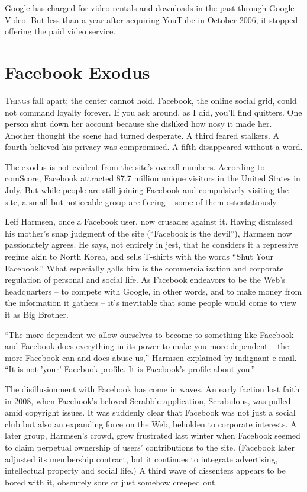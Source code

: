 ﻿\documentclass[12pt]{article}
\begin{document}
Google has charged for video rentals and downloads in the past through Google Video. But less than a
year after acquiring YouTube in October 2006, it stopped offering the paid video service.

\section{Facebook Exodus\cite{Exodus}}

\lettrine{T}{hings} fall apart; the center cannot hold. Facebook, the online social grid, could not
command loyalty forever. If you ask around, as I did, you'll find quitters. One person shut down her
account because she disliked how nosy it made her. Another thought the scene had turned desperate. A
third feared stalkers. A fourth believed his privacy was compromised. A fifth disappeared without a
word.

The exodus is not evident from the site's overall numbers. According to comScore, Facebook attracted
87.7 million unique visitors in the United States in July. But while people are still joining
Facebook and compulsively visiting the site, a small but noticeable group are fleeing -- some of
them ostentatiously.

Leif Harmsen, once a Facebook user, now crusades against it. Having dismissed his mother's snap
judgment of the site (``Facebook is the devil''), Harmsen now passionately agrees. He says, not
entirely in jest, that he considers it a repressive regime akin to North Korea, and sells T-shirts
with the words ``Shut Your Facebook.'' What especially galls him is the commercialization and
corporate regulation of personal and social life. As Facebook endeavors to be the Web's headquarters
-- to compete with Google, in other words, and to make money from the information it gathers -- it's
inevitable that some people would come to view it as Big Brother.

``The more dependent we allow ourselves to become to something like Facebook -- and Facebook does
everything in its power to make you more dependent -- the more Facebook can and does abuse us,''
Harmsen explained by indignant e-mail. ``It is not 'your' Facebook profile. It is Facebook's profile
about you.''

The disillusionment with Facebook has come in waves. An early faction lost faith in 2008, when
Facebook's beloved Scrabble application, Scrabulous, was pulled amid copyright issues. It was
suddenly clear that Facebook was not just a social club but also an expanding force on the Web,
beholden to corporate interests. A later group, Harmsen's crowd, grew frustrated last winter when
Facebook seemed to claim perpetual ownership of users' contributions to the site. (Facebook later
adjusted its membership contract, but it continues to integrate advertising, intellectual property
and social life.) A third wave of dissenters appears to be bored with it, obscurely sore or just
somehow creeped out.
\end{document}
